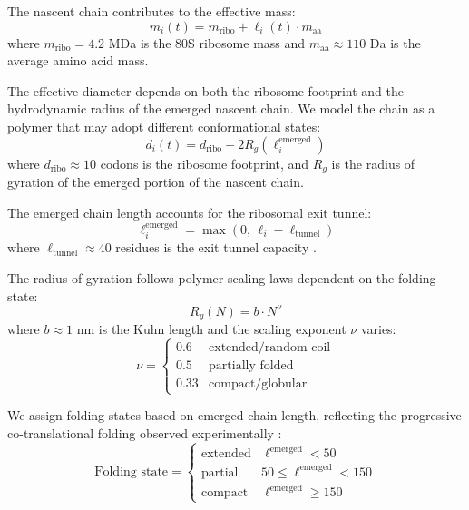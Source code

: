 \documentclass[11pt]{article}
\begin{document}
The nascent chain contributes to the effective mass:
\begin{equation}
    m_i(t) = m_{\text{ribo}} + \ell_i(t) \cdot m_{\text{aa}}
\end{equation}
where $m_{\text{ribo}} = 4.2$ MDa is the 80S ribosome mass and $m_{\text{aa}} \approx 110$ Da is the average amino acid mass.

The effective diameter depends on both the ribosome footprint and the hydrodynamic radius of the emerged nascent chain. We model the chain as a polymer that may adopt different conformational states:
\begin{equation}
    d_i(t) = d_{\text{ribo}} + 2R_g(\ell_i^{\text{emerged}})
\end{equation}
where $d_{\text{ribo}} \approx 10$ codons is the ribosome footprint, and $R_g$ is the radius of gyration of the emerged portion of the nascent chain.

The emerged chain length accounts for the ribosomal exit tunnel:
\begin{equation}
    \ell_i^{\text{emerged}} = \max\left(0, \, \ell_i - \ell_{\text{tunnel}}\right)
\end{equation}
where $\ell_{\text{tunnel}} \approx 40$ residues is the exit tunnel capacity \cite{wilson2011ribosome}.

The radius of gyration follows polymer scaling laws dependent on the folding state:
\begin{equation}
    R_g(N) = b \cdot N^{\nu}
\end{equation}
where $b \approx 1$ nm is the Kuhn length and the scaling exponent $\nu$ varies:
\begin{equation}
    \nu = 
    \begin{cases}
        0.6 & \text{extended/random coil} \\
        0.5 & \text{partially folded} \\
        0.33 & \text{compact/globular}
    \end{cases}
\end{equation}

We assign folding states based on emerged chain length, reflecting the progressive co-translational folding observed experimentally \cite{kaiser2011emergence, holtkamp2015cotranslational}:
\begin{equation}
    \text{Folding state} = 
    \begin{cases}
        \text{extended} & \ell^{\text{emerged}} < 50 \\
        \text{partial} & 50 \leq \ell^{\text{emerged}} < 150 \\
        \text{compact} & \ell^{\text{emerged}} \geq 150
    \end{cases}
\end{equation}
\end{document}
